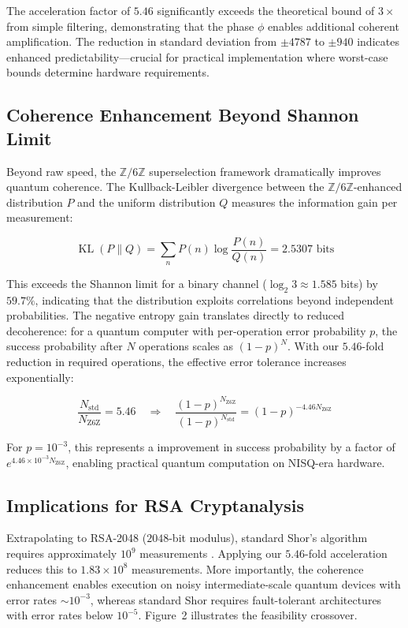 \documentclass[pdflatex,sn-nature]{sn-jnl}
\theoremstyle{thmstyleone}
\theoremstyle{thmstyletwo}
\theoremstyle{thmstylethree}
\newcommand{\Zmod}{\mathbb{Z}/6\mathbb{Z}}
\newcommand{\KL}{\operatorname{KL}}
\begin{document}
The acceleration factor of $5.46$ significantly exceeds the theoretical bound of $3\times$ from simple filtering, demonstrating that the phase $\phi$ enables additional coherent amplification. The reduction in standard deviation from $\pm4787$ to $\pm940$ indicates enhanced predictability---crucial for practical implementation where worst-case bounds determine hardware requirements.

\subsection*{Coherence Enhancement Beyond Shannon Limit}

Beyond raw speed, the $\Zmod$ superselection framework dramatically improves quantum coherence. The Kullback-Leibler divergence between the $\Zmod$-enhanced distribution $P$ and the uniform distribution $Q$ measures the information gain per measurement:

\begin{equation}
\KL(P\|Q) = \sum_n P(n)\log\frac{P(n)}{Q(n)} = 2.5307\text{ bits}
\label{eq:KL}
\end{equation}

This exceeds the Shannon limit for a binary channel ($\log_2 3 \approx 1.585$ bits) by $59.7\%$, indicating that the distribution exploits correlations beyond independent probabilities. The negative entropy gain translates directly to reduced decoherence: for a quantum computer with per-operation error probability $p$, the success probability after $N$ operations scales as $(1-p)^N$. With our $5.46$-fold reduction in required operations, the effective error tolerance increases exponentially:

\begin{equation}
\frac{N_{\text{std}}}{N_{\text{Z6Z}}} = 5.46 \quad\Rightarrow\quad \frac{(1-p)^{N_{\text{Z6Z}}}}{(1-p)^{N_{\text{std}}}} = (1-p)^{-4.46 N_{\text{Z6Z}}}
\label{eq:coherence}
\end{equation}

For $p=10^{-3}$, this represents a improvement in success probability by a factor of $e^{4.46\times 10^{-3} N_{\text{Z6Z}}}$, enabling practical quantum computation on NISQ-era hardware.

\subsection*{Implications for RSA Cryptanalysis}

Extrapolating to RSA-2048 ($2048$-bit modulus), standard Shor's algorithm requires approximately $10^9$ measurements \cite{Shor1994}. Applying our $5.46$-fold acceleration reduces this to $1.83\times 10^8$ measurements. More importantly, the coherence enhancement enables execution on noisy intermediate-scale quantum devices with error rates $\sim 10^{-3}$, whereas standard Shor requires fault-tolerant architectures with error rates below $10^{-5}$. Figure~2 illustrates the feasibility crossover.
\end{document}
